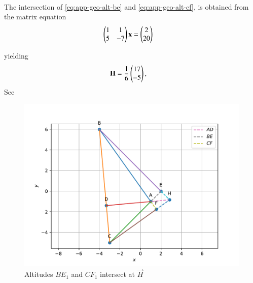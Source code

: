 \\ \solution
%
The intersection of 
		\eqref{eq:app-geo-alt-be}
		and
		\eqref{eq:app-geo-alt-cf},
		is obtained from 
		the matrix equation
\begin{align}
        \begin{pmatrix}1&1\\5&-7\end{pmatrix} \mathbf{x} &= \begin{pmatrix}2\\20\end{pmatrix}
\end{align}
%

yielding
%
\begin{align}
        \mathbf{H}&=\frac{1}{6}\begin{pmatrix}{17}\\-{5}\end{pmatrix}
		\label{eq:app-geo-alt-H},
\end{align}
%
See 
\begin{figure}[H]
\centering
\includegraphics[width=0.75\columnwidth]{figs/triangle/altitude.pdf}
\caption{Altitudes $BE_1$ and $CF_1$ intersect at $\vec{H}$}
\label{fig:m_tri_py}
\end{figure}

